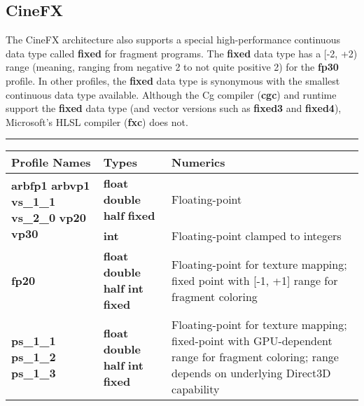 \documentclass[../main.tex]{subfiles}
\begin{document}
\subsection*{CineFX}

The CineFX architecture also supports a special high-performance continuous data type called \textbf{fixed} for fragment programs. The \textbf{fixed} data type has a [-2, +2) range (meaning, ranging from negative 2 to not quite positive 2) for the \textbf{fp30} profile. In other profiles, the \textbf{fixed} data type is synonymous with the smallest continuous data type available. Although the Cg compiler (\textbf{cgc}) and runtime support the \textbf{fixed} data type (and vector versions such as \textbf{fixed3} and \textbf{fixed4}), Microsoft's HLSL compiler (\textbf{fxc}) does not.
\hrule

\begin{table}
\centering
\begin{tabular}{ p{2cm} p{2cm} p{7cm}  } 

Profile Names & Types & Numerics \\
\hline

\multirow{2}{4em}{\textbf{arbfp1} \newline \textbf{arbvp1} \newline \textbf{vs_1_1} \newline \textbf{vs_2_0} \newline \textbf{vp20} \newline \textbf{vp30} } & \textbf{float} \newline \textbf{double} \newline \textbf{half} \newline \textbf{fixed} & Floating-point \\
\cline{2-3}
& \textbf{int} \newline & Floating-point clamped to integers \\
\hline

\textbf{fp20} & \textbf{float} \newline \textbf{double} \newline \textbf{half} \newline \textbf{int} \newline \textbf{fixed} & Floating-point for texture mapping; fixed point with [-1, +1] range for fragment coloring \\
\hline

\textbf{ps_1_1} \newline \textbf{ps_1_2} \newline \textbf{ps_1_3} & \textbf{float} \newline \textbf{double} \newline \textbf{half} \newline \textbf{int} \newline \textbf{fixed} & Floating-point for texture mapping; fixed-point with GPU-dependent range for fragment coloring; range depends on underlying Direct3D capability \\
\hline


\end{tabular}
\end{table}
\end{document}
